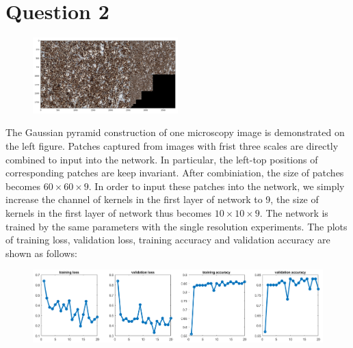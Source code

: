\documentclass[UTF8]{article}
\begin{document}
\section*{Question 2}
\begin{figure}
  \includegraphics[width=0.5\textwidth]{../imgs/pymid.png}
    \label{fig1}
\end{figure}
The Gaussian pyramid construction of one microscopy image is demonstrated on the left figure.
%
Patches captured from images with frist three scales are directly combined to input into the network.
%
In particular,
the left-top positions of corresponding patches are keep invariant.
%
After combiniation, 
the size of patches becomes $60 \times 60 \times 9$.
%
In order to input these patches into the network,
we simply increase the channel of kernels in the first layer of network to 9,
the size of kernels in the first layer of network thus becomes $10 \times 10 \times 9$.
%
The network is trained by the same parameters with the single resolution experiments.
%
The plots of training loss, validation loss, training accuracy and validation accuracy
are shown as follows:
\begin{figure}[htbp]	%
\centering
\includegraphics[width=\textwidth]{../imgs/mulloss.png}
\label{fig_bay}
\end{figure}
\end{document}
